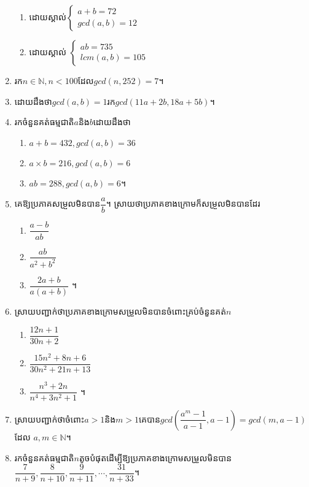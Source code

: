 \documentclass[a4paper,12pt]{book}
\newcommand{\N}{\mathbb{N}}
\begin{document}
\begin{enumerate}[1]
\begin{multicols}{2}
\begin{enumerate}[a]
\item ដោយស្គាល់$\begin{cases}
	a+b=72\\gcd(a,b)=12
\end{cases}$
\item ដោយស្គាល់ $\begin{cases}
ab=735\\lcm(a,b)=105
\end{cases}$
\end{enumerate}
\end{multicols}
\item រក$n\in{\N}, n<100$ដែល$gcd(n,252)=7$។
\item ដោយដឹងថា$gcd(a,b)=1$រក$gcd(11a+2b,18a+5b)$។
\item រកចំនួនគត់ធម្មជាតិ$a$និង$b$ដោយដឹងថា
\begin{enumerate}[a]
\item $a+b=432,gcd(a,b)=36$
\item $a\times b=216,gcd(a,b)=6$
\item $ab=288,gcd(a,b)=6$។
\end{enumerate}
\item គេឱ្យប្រភាគសម្រួលមិនបាន$\dfrac{a}{b}$។ ស្រាយថាប្រភាគខាងក្រោមក៏សម្រួលមិនបានដែរ
\begin{multicols}{3}
\begin{enumerate}[a]
\item $\dfrac{a-b}{ab}$
\item $\dfrac{ab}{a^{2}+b^{2}}$
\item $\dfrac{2a+b}{a(a+b)}$ ។
\end{enumerate}
\end{multicols}
\item ស្រាយបញ្ជាក់ថាប្រភាគខាងក្រោមសម្រួលមិនបានចំពោះគ្រប់ចំនួនគត់$n$
\begin{multicols}{3}
\begin{enumerate}[a]
\item $\dfrac{12n+1}{30n+2}$
\item $\dfrac{15n^{2}+8n+6}{30n^{2}+21n+13}$
\item $\dfrac{n^{3}+2n}{n^{4}+3n^{2}+1}$ ។
\end{enumerate}
\end{multicols}
\item ស្រាយបញ្ជាក់ថាចំពោះ$a>1$និង$m>1$គេបាន$gcd\left(\dfrac{a^{m}-1}{a-1},a-1\right)=gcd(m,a-1)$ដែល $a,m\in{\N}$។
\item រកចំនួនគត់ធម្មជាតិ$n$តូចបំផុតដើម្បីឱ្យប្រភាគខាងក្រោមសម្រួលមិនបាន$\dfrac{7}{n+9}, \dfrac{8}{n+10}, \dfrac{9}{n+11},\cdots,\dfrac{31}{n+33}$​ ។

\end{enumerate}
\end{document}
